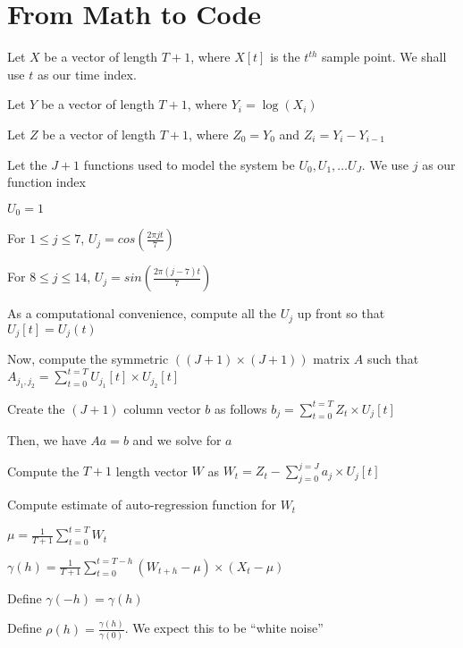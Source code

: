\documentclass[12pt,timesnewroman,letterpaper]{article}
\begin{document}
\section{From Math to Code}
\bi
\item Let \(X\) be a vector of length \(T+1\), where \(X[t]\) is the \(t^{th}\)
sample point. We shall use \(t\) as our time index.
\item Let \(Y\) be a vector of length \(T+1\), where \(Y_i = \log(X_i)\)
\item Let \(Z\) be a vector of length \(T+1\), where 
\(Z_0 = Y_0\) and 
\(Z_i = Y_i - Y_{i-1}\)
\item 
Let the \(J+1\) functions used to model the system 
be \(U_0, U_1, \ldots U_J\). We use \(j\) as our
function index
\be
\item \(U_0 = 1\)
\item For \(1 \leq j \leq 7 \), \(U_j = cos(\frac{2 \pi j t}{7})\)
\item For \(8 \leq j \leq 14 \), \(U_j = sin(\frac{2 \pi (j-7) t}{7})\)
\ee
\item As a computational convenience, 
compute all the \(U_j\) up front so that \(U_j[t] = U_j(t)\)
\item Now, compute the symmetric \(((J+1) \times (J+1))\) matrix \(A\)
such that 
\(A_{j_1, j_2} = \sum_{t=0}^{t=T} U_{j_1}[t] \times U_{j_2}[t] \)
\item Create the \((J+1)\) column vector \(b\) as follows
\(b_j = \sum_{t=0}^{t=T} Z_t \times U_j[t]\)
\item Then, we have \(A a = b\) and we solve for \(a\)
\item Compute the \(T+1\) length vector \(W\) as 
\(W_t = Z_t - \sum_{j=0}^{j=J} a_j \times U_j[t]\) 
\item Compute estimate of auto-regression function for \(W_t\)
\item \(\mu = \frac{1}{T+1} \sum_{t=0}^{t=T} W_t\) 
\item \(\gamma(h) = \frac{1}{T+1} \sum_{t=0}^{t=T-h} 
(W_{t+h} - \mu) \times (X_t - \mu)\)
\item Define \(\gamma(-h) = \gamma(h)\)
\item Define \(\rho(h) = \frac{\gamma(h)}{\gamma(0)}\). We expect this to be
``white noise''
\ei
\end{document}
